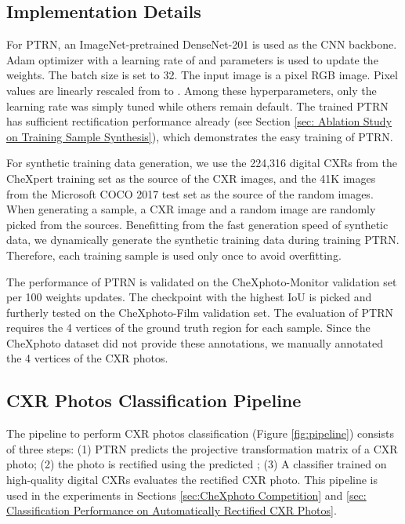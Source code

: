 \documentclass[preprint, 12pt]{elsarticle}
\begin{document}
\subsection{Implementation Details} \label{sec:Implementation Details}
For PTRN, an ImageNet-pretrained DenseNet-201 \cite{huang2017densely} is used as the CNN backbone. Adam optimizer \cite{kingma2014adam} with a learning rate of  and parameters  is used to update the weights. The batch size is set to 32. The input image is a  pixel RGB image. Pixel values are linearly rescaled from  to . Among these hyperparameters, only the learning rate was simply tuned while others remain default. The trained PTRN has sufficient rectification performance already (see Section \ref{sec: Ablation Study on Training Sample Synthesis}), which demonstrates the easy training of PTRN.

For synthetic training data generation, we use the 224,316 digital CXRs from the CheXpert training set as the source of the CXR images, and the 41K images from the Microsoft COCO 2017 test set \cite{lin2014microsoft} as the source of the random images. When generating a sample, a CXR image and a random image are randomly picked from the sources. Benefitting from the fast generation speed of synthetic data, we dynamically generate the synthetic training data during training PTRN. Therefore, each training sample is used only once to avoid overfitting.

The performance of PTRN is validated on the CheXphoto-Monitor validation set per 100 weights updates. The checkpoint with the highest IoU is picked and furtherly tested on the CheXphoto-Film validation set. The evaluation of PTRN requires the 4 vertices of the ground truth region for each sample. Since the CheXphoto dataset did not provide these annotations, we manually annotated the 4 vertices of the CXR photos.

\subsection{CXR Photos Classification Pipeline} \label{sec: CXR Photos Classification Pipeline}

The pipeline to perform CXR photos classification (Figure \ref{fig:pipeline}) consists of three steps: (1) PTRN predicts the projective transformation matrix  of a CXR photo; (2) the photo is rectified using the predicted  ; (3) A classifier trained on high-quality digital CXRs evaluates the rectified CXR photo. This pipeline is used in the experiments in Sections \ref{sec:CheXphoto Competition} and \ref{sec: Classification Performance on Automatically Rectified CXR Photos}.
\end{document}
